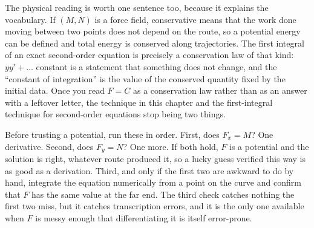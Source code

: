 The physical reading is worth one sentence too, because it explains the vocabulary. If $(M,N)$ is a force field, conservative means that the work done moving between two points does not depend on the route, so a potential energy can be defined and total energy is conserved along trajectories. The first integral of an exact second-order equation is precisely a conservation law of that kind: $yy'+\ldots$ constant is a statement that something does not change, and the ``constant of integration'' is the value of the conserved quantity fixed by the initial data. Once you read $F=C$ as a conservation law rather than as an answer with a leftover letter, the technique in this chapter and the first-integral technique for second-order equations stop being two things.

\begin{keynote}
Before trusting a potential, run these in order. First, does $F_x=M$? One derivative. Second, does $F_y=N$? One more. If both hold, $F$ is a potential and the solution is right, whatever route produced it, so a lucky guess verified this way is as good as a derivation. Third, and only if the first two are awkward to do by hand, integrate the equation numerically from a point on the curve and confirm that $F$ has the same value at the far end. The third check catches nothing the first two miss, but it catches transcription errors, and it is the only one available when $F$ is messy enough that differentiating it is itself error-prone.
\end{keynote}

